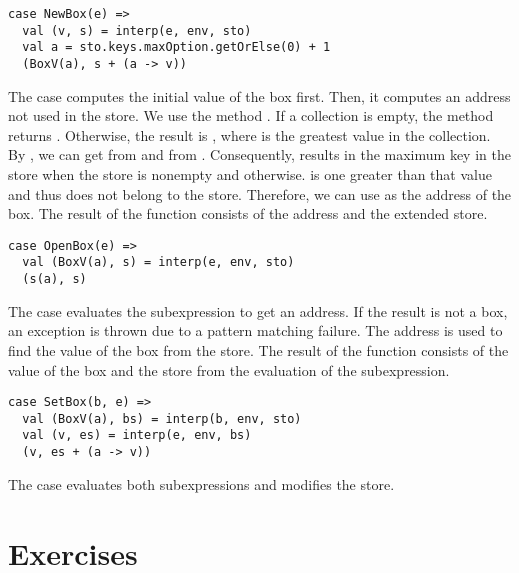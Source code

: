 \begin{verbatim}
case NewBox(e) =>
  val (v, s) = interp(e, env, sto)
  val a = sto.keys.maxOption.getOrElse(0) + 1
  (BoxV(a), s + (a -> v))
\end{verbatim}

The  case computes the initial value of the box first. Then, it
computes an address not used in the store. We use the method .
If a collection is empty, the method returns . Otherwise, the
result is , where  is the greatest value in the collection.
By , we can get  from  and 
from . Consequently,  results
in the maximum key in the store when the store is nonempty and 
otherwise.  is one greater than that value and thus does not belong to
the store. Therefore, we can use  as the address of the box.
The result of the function consists of the address and the extended store.

\begin{verbatim}
case OpenBox(e) =>
  val (BoxV(a), s) = interp(e, env, sto)
  (s(a), s)
\end{verbatim}

The  case evaluates the subexpression to get an address.
If the result is not a box, an exception is thrown due to a pattern matching
failure. The address is used to find the value of the box from the store.
The result of the function consists of the value of the box and the store from
the evaluation of the subexpression.

\begin{verbatim}
case SetBox(b, e) =>
  val (BoxV(a), bs) = interp(b, env, sto)
  val (v, es) = interp(e, env, bs)
  (v, es + (a -> v))
\end{verbatim}

The  case evaluates both subexpressions and modifies the store.

\section{Exercises}

